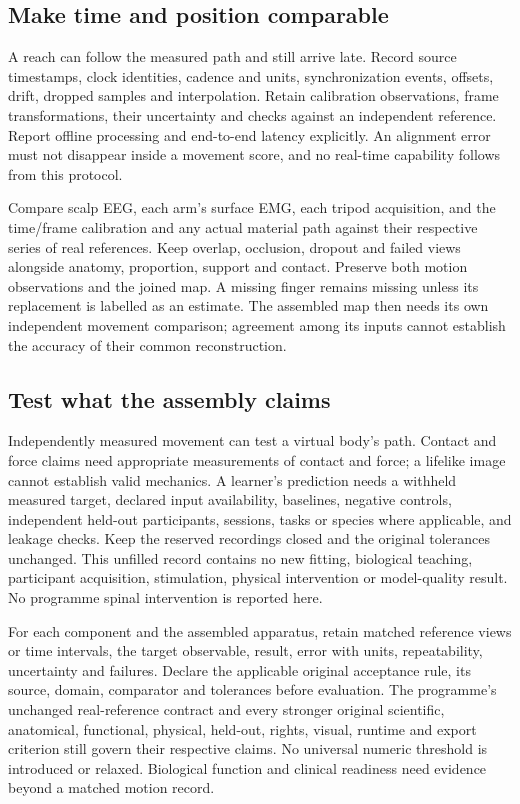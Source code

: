 \subsection*{Make time and position comparable}

A reach can follow the measured path and still arrive late. Record source
timestamps, clock identities, cadence and units, synchronization events,
offsets, drift, dropped samples and interpolation. Retain calibration
observations, frame transformations, their uncertainty and checks against an
independent reference. Report offline processing and end-to-end latency
explicitly. An alignment error must not disappear inside a movement score,
and no real-time capability follows from this protocol.

Compare scalp EEG, each arm's surface EMG, each tripod acquisition, and the
time/frame calibration and any actual material path against their respective
series of real references. Keep overlap, occlusion, dropout and failed views
alongside anatomy, proportion, support and contact. Preserve both motion
observations and the joined map. A missing finger remains missing unless its
replacement is labelled as an estimate. The assembled map then needs its own
independent movement comparison; agreement among its inputs cannot establish
the accuracy of their common reconstruction.

\subsection*{Test what the assembly claims}

Independently measured movement can test a virtual body's path. Contact and
force claims need appropriate measurements of contact and force; a lifelike
image cannot establish valid mechanics. A learner's prediction needs a
withheld measured target, declared input availability, baselines, negative
controls, independent held-out participants, sessions, tasks or species where
applicable, and leakage checks. Keep the reserved recordings closed and the
original tolerances unchanged. This unfilled record contains no new fitting, biological teaching, participant acquisition, stimulation, physical intervention or model-quality result. No programme spinal intervention is reported here.

For each component and the assembled apparatus, retain matched reference
views or time intervals, the target observable, result, error with units,
repeatability, uncertainty and failures. Declare the applicable original
acceptance rule, its source, domain, comparator and tolerances before evaluation.
The programme's unchanged real-reference contract and every stronger original
scientific, anatomical, functional, physical, held-out, rights, visual, runtime
and export criterion still govern their respective claims. No universal
numeric threshold is introduced or relaxed. Biological function and clinical
readiness need evidence beyond a matched motion record.

